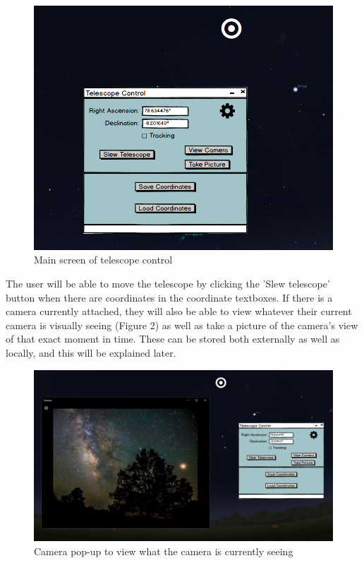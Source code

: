 \documentclass[12pt]{report}
\begin{document}
\begin{figure}[h]
	\centering
	\includegraphics[width=0.85\linewidth]{MainScreen}
	\caption{Main screen of telescope control}
\end{figure}

The user will be able to move the telescope by clicking the 'Slew telescope' button when there are coordinates in the coordinate textboxes. If there is a camera currently attached, they will also be able to view whatever their current camera is visually seeing (Figure 2) as well as take a picture of the camera's view of that exact moment in time. These can be stored both externally as well as locally, and this will be explained later.

\newpage

\begin{figure}[h]
	\centering
	\includegraphics[width=0.90\linewidth]{MainScreenwithCameraView}
	\caption{Camera pop-up to view what the camera is currently seeing}
\end{figure}
\end{document}
